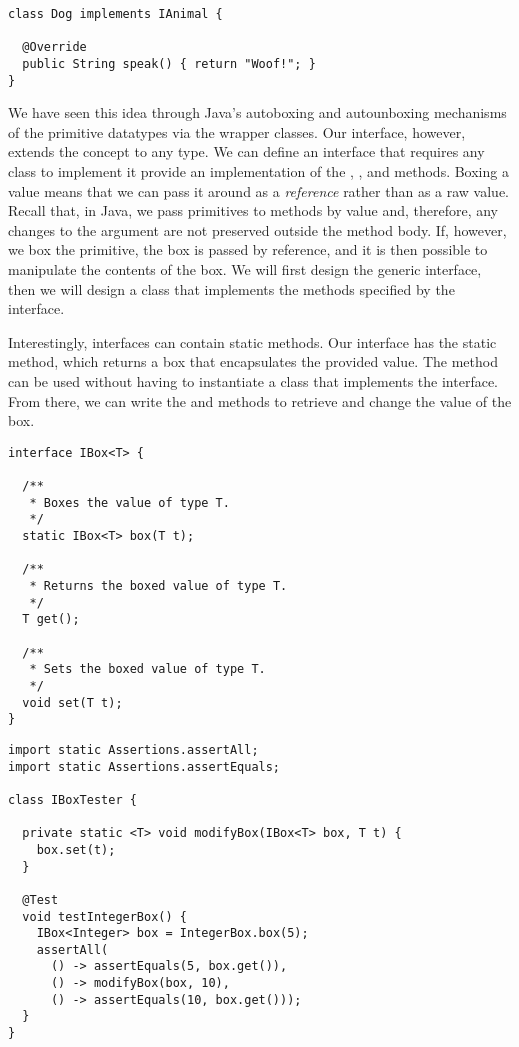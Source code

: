 \begin{lstlisting}[language=MyJava]
class Dog implements IAnimal {

  @Override
  public String speak() { return "Woof!"; }
}
\end{lstlisting}

We have seen this idea through Java's autoboxing and autounboxing mechanisms of the primitive datatypes via the wrapper classes. 
Our interface, however, extends the concept to any type. 
We can define an interface that requires any class to implement it provide an implementation of the , , and  methods. 
Boxing a value means that we can pass it around as a \emph{reference} rather than as a raw value. 
Recall that, in Java, we pass primitives to methods by value and, therefore, any changes to the argument are not preserved outside the method body. 
If, however, we box the primitive, the box is passed by reference, and it is then possible to manipulate the contents of the box. 
We will first design the generic  interface, then we will design a class that implements the methods specified by the interface.

Interestingly, interfaces can contain static methods. 
Our  interface has the static  method, which returns a box that encapsulates the provided value. 
The  method can be used without having to instantiate a class that implements the  interface. 
From there, we can write the  and  methods to retrieve and change the value of the box.

\begin{lstlisting}[language=MyJava]
interface IBox<T> {
  
  /**
   * Boxes the value of type T.
   */
  static IBox<T> box(T t);

  /**
   * Returns the boxed value of type T.
   */
  T get();

  /**
   * Sets the boxed value of type T.
   */
  void set(T t);
}
\end{lstlisting}

\begin{lstlisting}[language=MyJava]
import static Assertions.assertAll;
import static Assertions.assertEquals;

class IBoxTester {

  private static <T> void modifyBox(IBox<T> box, T t) {
    box.set(t);
  }
  
  @Test
  void testIntegerBox() {
    IBox<Integer> box = IntegerBox.box(5);
    assertAll(
      () -> assertEquals(5, box.get()),
      () -> modifyBox(box, 10),
      () -> assertEquals(10, box.get()));
  }
}
\end{lstlisting}

